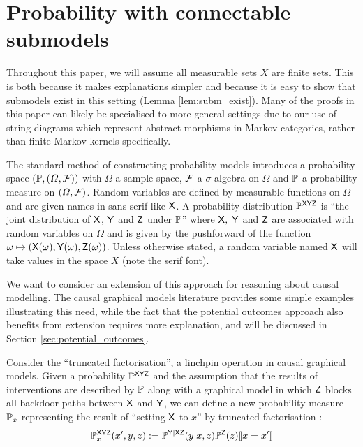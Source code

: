 

\section{Probability with connectable submodels}

Throughout this paper, we will assume all measurable sets $X$ are finite sets. This is both because it makes explanations simpler and because it is easy to show that submodels exist in this setting (Lemma \ref{lem:subm_exist}). Many of the proofs in this paper can likely be specialised to more general settings due to our use of string diagrams which represent abstract morphisms in Markov categories, rather than finite Markov kernels specifically.

The standard method of constructing probability models introduces a probability space $(\mathbb{P},(\Omega,\mathcal{F}))$ with $\Omega$ a sample space, $\mathcal{F}$ a $\sigma$-algebra on $\Omega$ and $\mathbb{P}$ a probability measure on $(\Omega,\mathcal{F})$. Random variables are defined by measurable functions on $\Omega$ and are given names in sans-serif like $\mathsf{X}$. A probability distribution $\mathbb{P}^{\mathsf{XYZ}}$ is ``the joint distribution of $\mathsf{X}$, $\mathsf{Y}$ and $\mathsf{Z}$ under $\mathbb{P}$'' where $\mathsf{X},$ $\mathsf{Y}$ and $\mathsf{Z}$ are associated with random variables on $\Omega$ and is given by the pushforward of the function $\omega\mapsto (\mathsf{X}(\omega),\mathsf{Y}(\omega),\mathsf{Z}(\omega))$. Unless otherwise stated, a random variable named $\mathsf{X}$ will take values in the space $X$ (note the serif font).

We want to consider an extension of this approach for reasoning about causal modelling. The causal graphical models literature provides some simple examples illustrating this need, while the fact that the potential outcomes approach also benefits from extension requires more explanation, and will be discussed in Section \ref{sec:potential_outcomes}. 

Consider the ``truncated factorisation'', a linchpin operation in causal graphical models. Given a probability $\mathbb{P}^{\mathsf{XYZ}}$ and the assumption that the results of interventions are described by $\mathbb{P}$ along with a graphical model in which $\mathsf{Z}$ blocks all backdoor paths between $\mathsf{X}$ and $\mathsf{Y}$, we can define a new probability measure $\mathbb{P}_x$ representing the result of ``setting $\mathsf{X}$ to $x$'' by truncated factorisation \citep[page ~24]{pearl_causality:_2009}:
\begin{align}
	\mathbb{P}^{\mathsf{XYZ}}_{x}(x',y,z):=\mathbb{P}^{\mathsf{Y|XZ}}(y|x,z)\mathbb{P}^{\mathsf{Z}}(z)\llbracket x=x'\rrbracket\label{eq:truncated_fac}
\end{align}

